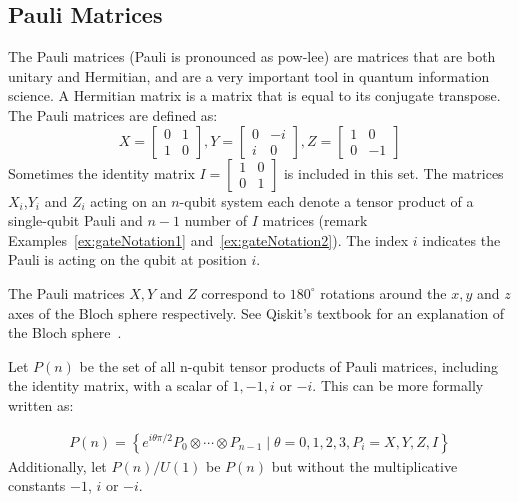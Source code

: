 \subsection{Pauli Matrices}
\label{subsubsection:paulis}
The Pauli matrices (Pauli is pronounced as pow-lee) are matrices that are both unitary and Hermitian, and are a very important tool in quantum information science. A Hermitian matrix is a matrix that is equal to its conjugate transpose. The Pauli matrices are defined as:
$$X = \begin{bmatrix} 0 & 1 \\ 1 & 0\end{bmatrix}, Y = \begin{bmatrix} 0 & -i \\ i & 0\end{bmatrix}, Z =  \begin{bmatrix} 1 & 0 \\ 0 & -1\end{bmatrix}$$
Sometimes the identity matrix $I = \begin{bmatrix} 1 & 0 \\ 0 & 1\end{bmatrix}$ is included in this set. The matrices $X_i$,$Y_i$ and $Z_i$ acting on an $n$-qubit system each denote a tensor product of a single-qubit Pauli and $n-1$ number of $I$ matrices (remark Examples~\ref{ex:gateNotation1} and~\ref{ex:gateNotation2}). The index $i$ indicates the Pauli is acting on the qubit at position $i$.

The Pauli matrices $X,Y$ and $Z$ correspond to $180^{\circ}$ rotations around the $x,y$ and $z$ axes of the Bloch sphere respectively. See Qiskit's textbook for an explanation of the Bloch sphere~\cite{Qiskit-Textbook}.

Let $P(n)$ be the set of all n-qubit tensor products of Pauli matrices, including the identity matrix, with a scalar of $1, -1, i$ or $-i$. This can be more formally written as:

\begin{align}
\label{eq:pauliDefinition}
P(n)=\left\{ e^{i\theta\pi/2} P_0 \otimes \cdots \otimes P_{n-1} \mid \theta = 0,1,2,3, P_i = X,Y,Z,I\right\}
\end{align}
Additionally, let $P(n) / U(1)$ be $P(n)$ but without the multiplicative constants $-1$, $i$ or $-i$.

